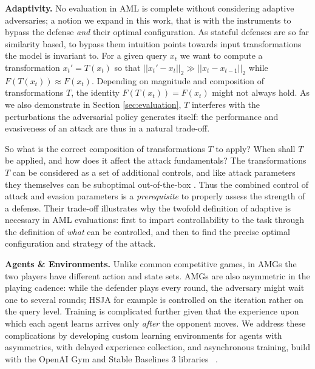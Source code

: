 \textbf{Adaptivity.} No evaluation in \gls{AML} is complete without considering adaptive adversaries; a notion we expand in this work, that is with the instruments to bypass the defense \textit{and} their optimal configuration.
As stateful defenses are so far similarity based, to bypass them intuition points towards input transformations the model is invariant to.
For a given query $x_t$ we want to compute a transformation $x_t' = T(x_t)$ so that $||x_t' - x_t||_2 \gg ||x_t - x_{t-1}||_2$ while $F(T(x_t)) \approx F(x_t)$.
Depending on magnitude and composition of transformations $T$, the identity $F(T(x_t)) = F(x_t)$ might not always hold.
As we also demonstrate in Section \ref{sec:evaluation}, $T$ interferes with the perturbations the adversarial policy generates itself: the performance and evasiveness of an attack are thus in a natural trade-off.

So what is the correct composition of transformations $T$ to apply?
When shall $T$ be applied, and how does it affect the attack fundamentals?
The transformations $T$ can be considered as a set of additional controls, and like attack parameters they themselves can be suboptimal out-of-the-box \cite{croce2020reliable}.
Thus the combined control of attack and evasion parameters is a \emph{prerequisite} to properly assess the strength of a defense.
Their trade-off illustrates why the twofold definition of adaptive is necessary in \gls{AML} evaluations: first to impart controllability to the task through the definition of \textit{what} can be controlled, and then to find the precise optimal configuration and strategy of the attack.

\textbf{Agents \& Environments.} Unlike common competitive games, in AMGs the two players have different action and state sets.
AMGs are also asymmetric in the playing cadence: while the defender plays every round, the adversary might wait one to several rounds; HSJA for example is controlled on the iteration rather on the query level.
Training is complicated further given that the experience upon which each agent learns arrives only \emph{after} the opponent moves.
We address these complications by developing custom learning environments for agents with asymmetries, with delayed experience collection, and asynchronous training, build with the OpenAI Gym and Stable Baselines 3 libraries ~\cite{brockman2016openai, raffin2019stable}.

